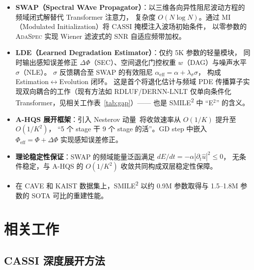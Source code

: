 \documentclass[a4paper,11pt,twocolumn]{ctexart}
\newcommand{\smiletwo}{SMILE\textsuperscript{2}}
\newcommand{\swap}{\textsc{SWAP}}
\newcommand{\lde}{\textsc{LDE}}
\newcommand{\ahqs}{\textsc{A-HQS}}
\newcommand{\mi}{\textsc{MI}}
\newcommand{\adaspec}{\textsc{AdaSpec}}
\newcommand{\secm}{\textsc{SEC}}
\newcommand{\dag}{\textsc{DAG}}
\newcommand{\nle}{\textsc{NLE}}
\newcommand{\PhiEff}{\Phi_{\mathrm{eff}}}
\newcommand{\alphaEff}{\alpha_{\mathrm{eff}}}
\begin{document}
\begin{itemize}
\item \textbf{\swap{}（Spectral WAve Propagator）}：以三维各向异性阻尼波动方程的频域闭式解替代 Transformer 注意力，
  复杂度 $O(N\log N)$。通过 \mi{}（Modulated Initialization）将 CASSI 掩模注入波场初始条件，
  以零参数的 \adaspec{} 实现 Wiener 滤波式的 SNR 自适应频带加权。

\item \textbf{\lde{}（Learned Degradation Estimator）}：仅约 5K 参数的轻量模块，
  同时输出感知误差修正 $\Delta\Phi$（\secm）、空间退化门控权重 $w$（\dag）与噪声水平 $\sigma$（\nle）。
  $\sigma$ 反馈耦合至 \swap{} 的有效阻尼 $\alphaEff = \alpha + \lambda_\sigma \sigma$，
  构成 Estimation$\leftrightarrow$Evolution 闭环。
  这是首个将退化估计与频域 PDE 传播算子实现双向耦合的工作（现有方法如
  RDLUF/DERNN-LNLT 仅单向条件化 Transformer，见相关工作表~\ref{tab:gap}）——
  也是 \smiletwo{} 中 ``E$^2$'' 的含义。

\item \textbf{\ahqs{} 展开框架}：引入 Nesterov 动量~\citep{nesterov1983,zhou2023rdfnet}将收敛速率从 $O(1/K)$ 提升至 $O(1/K^2)$，
  ``5 个 stage 干 9 个 stage 的活''。GD step 中嵌入 $\PhiEff = \Phi + \Delta\Phi$ 实现感知误差修正。

\item \textbf{理论稳定性保证}：\swap{} 的频域能量泛函满足 $dE/dt = -\alpha|\partial_t \hat{u}|^2 \le 0$，
  无条件稳定，与 \ahqs{} 的 $O(1/K^2)$ 收敛共同构成双层稳定性保障。

\item 在 CAVE 和 KAIST 数据集上，\smiletwo{} 以约 0.9M 参数取得与 1.5--1.8M 参数的 SOTA 可比的重建性能。
\end{itemize}

\section{相关工作}\label{sec:related}

\subsection{CASSI 深度展开方法}
\end{document}
